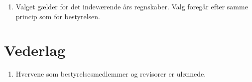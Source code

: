 \documentclass[a4paper, 10pt]{article}
\renewcommand\thesection{\textsection\arabic{section}}
\newenvironment{stykenum}{
  \begin{enumerate}[%
    label=Stk.~\arabic*., ref=\thesection~Stk.~\arabic*, start=1]
}{\end{enumerate}}
\begin{document}
\begin{stykenum}
\subsubsection*{Optælling}
\begin{itemize}

\item Der udregnes fordelingstal svarende til gyldige stemmer/antal poster.

\item Har nogen kandidater opnået fordelingstallet på 1.-stemmer er disse
\\ valgt. Nr. 1 er den med flest 1.-stemmer osv.

\item For de kandidater, der ikke opnår fordelingstallet med
1.-stemmer, ses på 2.-stemmer lagt sammen med 1.-stemmer. Hvis der
stadig er ubesatte poster, ses på 1.-stemmer lagt sammen med 2.stemmer
og 3.-stemmer, osv.

\item Er der stemmelighed på 1.-stemmer, er antallet af 2.-stemmer
afgørende for hvem er nr.  1, osv.

\item Har to kandidater stemmelighed ved alle prioritetsstemmer
foretages \\ lodtrækning.

\end{itemize}

\subsection*{Valg af revisorer}

\item Valget gælder for det indeværende års regnskaber. Valg foregår efter
samme princip som for bestyrelsen.
\end{stykenum}

\section{Vederlag}
\begin{stykenum}
    \item Hvervene som bestyrelsesmedlemmer og revisorer er ulønnede.
\end{stykenum}
\end{document}
